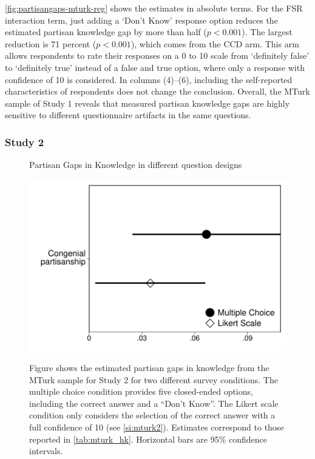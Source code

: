 \documentclass[12pt, letterpaper]{article}
\begin{document}
\cref{fig:partisangaps-mturk-reg} shows the estimates in absolute terms. For the FSR interaction term, just adding a `Don't Know' response option reduces the estimated partisan knowledge gap by more than half ($p<0.001$).
The largest reduction is 71 percent ($p<0.001$), which comes from the CCD arm. This arm allows respondents to rate their responses on a 0 to 10 scale from `definitely false' to `definitely true' instead of a false and true option, where only a response with confidence of 10 is considered. In columns (4)--(6), including the self-reported characteristics of respondents does not change the conclusion. Overall, the MTurk sample of Study 1 reveals that measured partisan knowledge gaps are highly sensitive to different questionnaire artifacts in the same questions.


\subsubsection*{Study 2}
\begin{center}
	\begin{figure}[h]
		\centering
		\caption{Partisan Gaps in Knowledge in different question designs}
		\includegraphics[width=.55\textwidth]{../figs/mturk-hk-MC-LIKERT.pdf}
		\label{fig:mturk_hk}
		\caption*{\scriptsize 
			Figure shows the estimated partisan gaps in knowledge from the MTurk sample for Study 2 for two different survey conditions.
			The multiple choice condition provides five closed-ended options, including the correct answer and a ``Don't Know''.
			The Likert scale condition only considers the selection of the correct answer with a full confidence of 10 (see \cref{si:mturk2}). 
			Estimates correspond to those reported in \cref{tab:mturk_hk}.
			Horizontal bars are 95\% confidence intervals.
		}
	\end{figure}
\end{center}



\newpage
\end{document}
